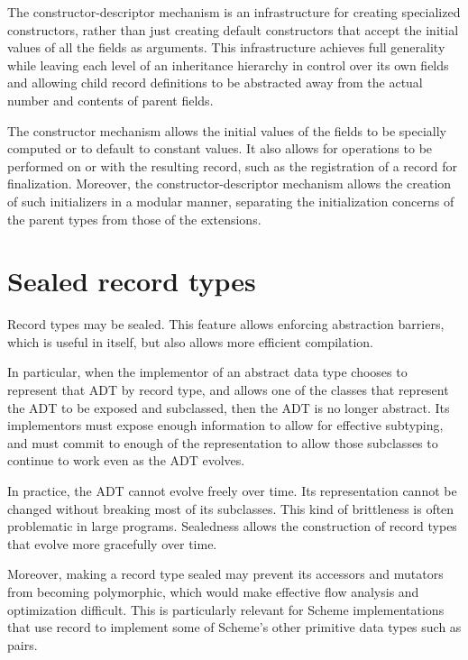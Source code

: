\documentclass[twoside,twocolumn]{algol60}
\begin{document}
The constructor-descriptor mechanism is an infra\-struc\-ture for
creating specialized constructors, rather than just creating default
constructors that accept the initial values of all the fields as
arguments. This infrastructure achieves full generality while leaving
each level of an inheritance hierarchy in control over its own fields
and allowing child record definitions to be abstracted away from the
actual number and contents of parent fields.

The constructor mechanism allows the initial values of the fields to be specially
computed or to default to constant values. It also allows for
operations to be performed on or with the resulting record, such as
the registration of a record for finalization. Moreover, the
constructor-descriptor mechanism allows the creation of such
initializers in a modular manner, separating the initialization
concerns of the parent types from those of the extensions.

\section{Sealed record types}

Record types may be sealed.  This feature allows enforcing abstraction
barriers, which is useful in itself, but also allows more efficient
compilation.

In particular, when the implementor of an abstract data type chooses
to represent that ADT by record type, and allows one of the classes
that represent the ADT to be exposed and subclassed, then the ADT is
no longer abstract.  Its implementors must expose enough information
to allow for effective subtyping, and must commit to enough of the
representation to allow those subclasses to continue to work even as
the ADT evolves.

In practice, the ADT cannot evolve freely over time.  Its
representation cannot be changed without breaking most of its
subclasses.  This kind of brittleness is often problematic in
large programs.  Sealedness allows the construction of record types
that evolve more gracefully over time.

Moreover, making a record type sealed may prevent its accessors and
mutators from becoming polymorphic, which would make effective flow analysis and
optimization difficult.  This is particularly relevant for
Scheme implementations that use record to implement some of Scheme's
other primitive data types such as pairs.

%
\end{document}
